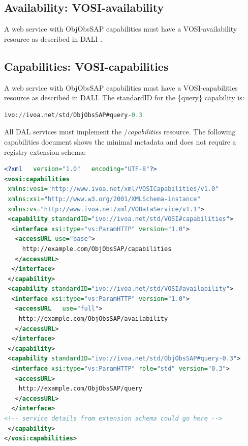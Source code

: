 \documentclass[11pt,a4paper]{ivoatex/ivoa}
\begin{document}
\subsection{Availability: VOSI-availability}
A web service with ObjObsSAP capabilities  \citep{2017ivoa.spec.0524G} must have a
VOSI-availability resource as described in DALI \citep{2017ivoa.spec.0517D}.

\subsection{Capabilities: VOSI-capabilities}
A web service with ObjObsSAP capabilities must have a VOSI-capabilities
resource as described in DALI. The standardID for the \{query\}
capability is:

\begin{lstlisting}[language=SQL]
ivo://ivoa.net/std/ObjObsSAP#query-0.3
\end{lstlisting}
All DAL services must implement the /\textit{capabilities} resource.
The following capabilities document shows the minimal metadata and does
not require a registry extension schema:

\begin{lstlisting}[language=XML]
<?xml	version="1.0"	encoding="UTF-8"?>
<vosi:capabilities
 xmlns:vosi="http://www.ivoa.net/xml/VOSICapabilities/v1.0"
 xmlns:xsi="http://www.w3.org/2001/XMLSchema-instance"
 xmlns:vs="http://www.ivoa.net/xml/VODataService/v1.1">
 <capability standardID="ivo://ivoa.net/std/VOSI#capabilities">
  <interface xsi:type="vs:ParamHTTP" version="1.0">
   <accessURL use="base">
     http://example.com/ObjObsSAP/capabilities
   </accessURL>
  </interface>
 </capability>
 <capability standardID="ivo://ivoa.net/std/VOSI#availability">
  <interface xsi:type="vs:ParamHTTP" version="1.0">
   <accessURL	use="full">
    http://example.com/ObjObsSAP/availability
   </accessURL>
  </interface>
 </capability>
 <capability standardID="ivo://ivoa.net/std/ObjObsSAP#query-0.3">
  <interface xsi:type="vs:ParamHTTP" role="std"	version="0.3">
   <accessURL>
    http://example.com/ObjObsSAP/query
   </accessURL>
  </interface>
<!-- service details from extension schema could go here -->
 </capability>
</vosi:capabilities>

\end{lstlisting}
\end{document}
